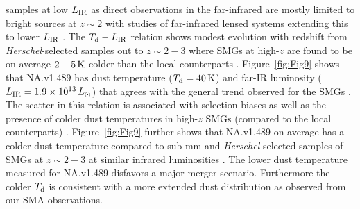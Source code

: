 \documentclass[iop,apj,useAMS,usenatbib]{emulateapj-rtx4}
\begin{document}
samples at low $L_{\rm IR}$ \citep{Casey2009, Magnelli2012} as direct observations in the
far-infrared are mostly limited to bright sources at $z\sim2$
\citep{Magdis2010} with studies of far-infrared lensed systems extending this to
lower $L_{\rm IR}$ \citep{Bussmann2013, Nayyeri2016}. The $T_{\rm d}-L_{\rm IR}$
relation shows modest evolution with redshift from {\it Herschel}-selected
samples out to $z\sim2-3$ \citep{Hwang2010} where SMGs at high-$z$
are found to be on average $\rm 2-5\,K$ colder than the local
counterparts \citep{Hwang2010}. Figure~\ref{fig:Fig9}
shows that NA.v1.489 has dust temperature ($T_{\rm d}=40\,{\rm K}$) and far-IR
luminosity ($L_{\rm IR}=1.9\times10^{13}\,L_{\odot}$) that
agrees with the general trend observed for the SMGs
\citep{Chapman2005}. The scatter in this relation is associated with
selection biases as well as the presence of colder dust temperatures
in high-$z$ SMGs (compared to the local counterparts)
\citep{Magnelli2012}. Figure~\ref{fig:Fig9} further shows
that NA.v1.489 on average has a colder dust temperature compared to sub-mm and
{\it Herschel}-selected samples of SMGs at $z\sim2-3$ at similar infrared luminosities
\citep{Casey2012, Magnelli2012}. The lower dust temperature measured for
NA.v1.489 disfavors a major merger scenario. Furthermore the colder $T_{\rm
  d}$ is consistent with a more extended dust distribution
\citep{Hwang2010} as observed from our SMA observations.
\end{document}

